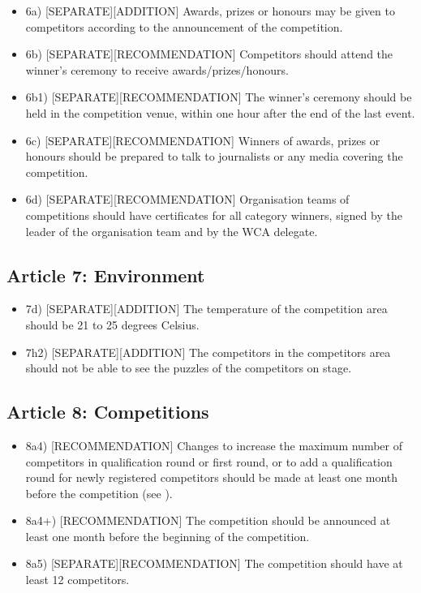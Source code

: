 \begin{itemize}
\item
  6a) {[}SEPARATE{]}{[}ADDITION{]} Awards, prizes or honours may be
  given to competitors according to the announcement of the competition.
\item
  6b) {[}SEPARATE{]}{[}RECOMMENDATION{]} Competitors should attend the
  winner's ceremony to receive awards/prizes/honours.
\item
  6b1) {[}SEPARATE{]}{[}RECOMMENDATION{]} The winner's ceremony should
  be held in the competition venue, within one hour after the end of the
  last event.
\item
  6c) {[}SEPARATE{]}{[}RECOMMENDATION{]} Winners of awards, prizes or
  honours should be prepared to talk to journalists or any media
  covering the competition.
\item
  6d) {[}SEPARATE{]}{[}RECOMMENDATION{]} Organisation teams of
  competitions should have certificates for all category winners, signed
  by the leader of the organisation team and by the WCA delegate.
\end{itemize}

\subsection{ Article 7: Environment}

\begin{itemize}
\item
  7d) {[}SEPARATE{]}{[}ADDITION{]} The temperature of the competition
  area should be 21 to 25 degrees Celsius.
\item
  7h2) {[}SEPARATE{]}{[}ADDITION{]} The competitors in the competitors
  area should not be able to see the puzzles of the competitors on
  stage.
\end{itemize}

\subsection{ Article 8: Competitions}

\begin{itemize}
\item
  8a4) {[}RECOMMENDATION{]} Changes to increase the maximum number of
  competitors in qualification round or first round, or to add a
  qualification round for newly registered competitors should be made at
  least one month before the competition (see ).
\item
  8a4+) {[}RECOMMENDATION{]} The competition should be announced at
  least one month before the beginning of the competition.
\item
  8a5) {[}SEPARATE{]}{[}RECOMMENDATION{]} The competition should have at
  least 12 competitors.
\end{itemize}

